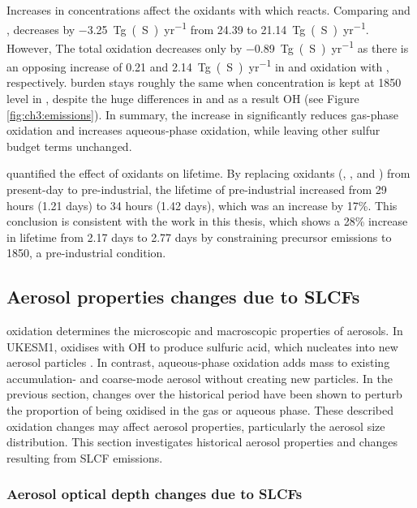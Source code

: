 Increases in  concentrations affect the oxidants with which  reacts. Comparing \histsst{} and \sstpich{},  decreases by \qty{-3.25}{Tg(S)~yr^{-1}} from 24.39 to \qty{21.14}{Tg(S)~yr^{-1}}. However, The total oxidation decreases only by \qty{-0.89}{Tg(S)~yr^{-1}} as there is an opposing increase of \num{0.21} and \qty{2.14}{Tg(S)~yr^{-1}} in  and  oxidation with , respectively.  burden stays roughly the same when  concentration is kept at 1850 level in \sstpich{}, despite the huge differences in  and as a result OH (see Figure \ref{fig:ch3:emissions}). In summary, the increase in  significantly reduces gas-phase oxidation and increases aqueous-phase oxidation, while leaving other sulfur budget terms unchanged.



\citet{karsetStrongImpactsAerosol2018} quantified the effect of oxidants on  lifetime. By replacing oxidants (, ,  and ) from present-day to pre-industrial, the lifetime of pre-industrial  increased from 29 hours (1.21 days) to 34 hours (1.42 days), which was an increase by 17\%. This conclusion is consistent with the work in this thesis, which shows a 28\% increase in  lifetime from 2.17 days to 2.77 days by constraining  precursor emissions to 1850, a pre-industrial condition.  



\subsection{Aerosol properties changes due to SLCFs}

 oxidation determines the microscopic and macroscopic properties of aerosols. In UKESM1,  oxidises with OH to produce sulfuric acid, which nucleates into new aerosol particles \citep{mannDescriptionEvaluationGLOMAPmode2010}. In contrast, aqueous-phase oxidation adds mass to existing accumulation- and coarse-mode aerosol without creating new particles. In the previous section, changes over the historical period have been shown to perturb the proportion of  being oxidised in the gas or aqueous phase. These described oxidation changes may affect aerosol properties, particularly the aerosol size distribution. This section investigates historical aerosol properties and changes resulting from SLCF emissions.  

\subsubsection{Aerosol optical depth changes due to SLCFs}

